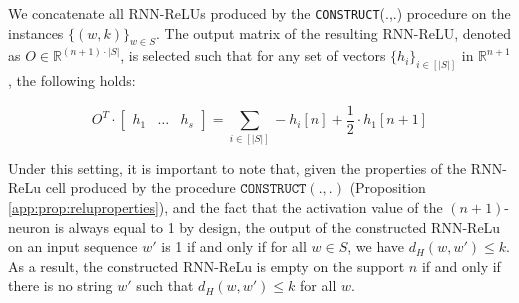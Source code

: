 We concatenate all RNN-ReLUs produced by the \texttt{CONSTRUCT}(.,.) procedure on the instances $\{(w,k)\}_{w \in S}$. The output matrix of the resulting RNN-ReLU, denoted as $O \in \mathbb{R}^{(n+1) \cdot |S|}$, is selected such that for any set of vectors $\{h_{i}\}_{i \in [|S|]}$ in $\mathbb{R}^{n+1}$, the following holds:

$$O^{T} \cdot \begin{bmatrix}
    h_{1} & \ldots & h_{s}
\end{bmatrix} = \sum\limits_{i \in [|S|]} - h_{i}[n] + \frac{1}{2} \cdot h_{1}[n+1]$$



Under this setting, it is important to note that, given the properties of the RNN-ReLu cell produced by the procedure $\texttt{CONSTRUCT}(.,.)$ (Proposition \ref{app:prop:reluproperties}), and the fact that the activation value of the $(n+1)$-neuron is always equal to 1 by design, the output of the constructed RNN-ReLu on an input sequence $w'$ is 1 if and only if for all $w \in S$, we have $d_{H}(w,w') \leq k$. As a result, the constructed RNN-ReLu is empty on the support $n$ if and only if there is no string $w'$ such that $d_{H}(w,w') \leq k$ for all $w$.

